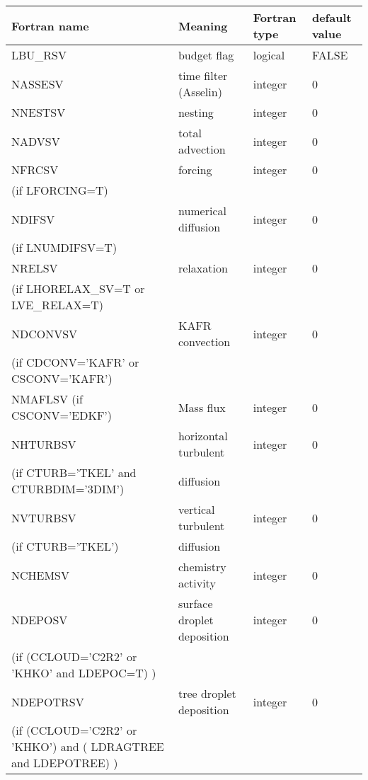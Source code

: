 \begin{center}
\begin{tabular} {|p{8cm}|p{4cm}|>{\centering}p{1.5cm}|p{1.5cm}<{\centering}|} 
\hline
Fortran name & Meaning & Fortran type & default value \\
\hline\hline
LBU\_RSV & budget flag & logical & FALSE\index{LBU\_RSV!\innam{NAM\_BU\_RSV}}\\\hline
NASSESV  & time filter (Asselin)   & integer  &  0 \index{NASSESV!\innam{NAM\_BU\_RSV}} \\\hline
NNESTSV  & nesting       & integer  &  0 \index{NNESTSV!\innam{NAM\_BU\_RSV}} \\\hline
NADVSV   & total advection   & integer  &  0 \index{NADVSV!\innam{NAM\_BU\_RSV}}\\\hline
NFRCSV   & forcing           & integer  &  0 \index{NFRCSV!\innam{NAM\_BU\_RSV}} \\
(if LFORCING=T) &  &   &   \\\hline
NDIFSV   & numerical diffusion & integer &  0 \index{NDIFSV!\innam{NAM\_BU\_RSV}}\\
(if LNUMDIFSV=T) &  &   &   \\\hline
NRELSV   & relaxation        & integer  &  0 \index{NRELSV!\innam{NAM\_BU\_RSV}}\\
(if LHORELAX\_SV=T or LVE\_RELAX=T) &  &   &   \\\hline
NDCONVSV & KAFR convection   & integer  &  0 \index{NDCONVSV!\innam{NAM\_BU\_RSV}} \\
(if CDCONV='KAFR' or CSCONV='KAFR') &  &   &   \\\hline
NMAFLSV (if CSCONV='EDKF') & Mass flux & integer  &  0 \index{NMAFLSV!\innam{NAM\_BU\_RSV}} \\\hline
NHTURBSV & horizontal turbulent  & integer  &  0 \index{NHTURBSV!\innam{NAM\_BU\_RSV}} \\
(if CTURB='TKEL' and CTURBDIM='3DIM') &diffusion &   &  \\\hline
NVTURBSV & vertical turbulent  & integer  &  0 \index{NVTURBSV!\innam{NAM\_BU\_RSV}}\\
(if CTURB='TKEL') &diffusion &   &  \\\hline
NCHEMSV & chemistry activity & integer  &  0 \index{NCHEMSV!\innam{NAM\_BU\_RSV}} \\
NDEPOSV  & surface droplet deposition   & integer  &  0 \index{NDEPOSV!\innam{NAM\_BU\_RRC}}\\
(if (CCLOUD='C2R2' or 'KHKO' and LDEPOC=T) ) &  &   &   \\\hline
NDEPOTRSV  & tree droplet deposition   & integer  &  0 \index{NDEPOTRSV!\innam{NAM\_BU\_RRC}}\\
(if (CCLOUD='C2R2' or 'KHKO') and ( LDRAGTREE and LDEPOTREE)  ) &  &   &   \\\hline
\end{tabular}
\end{center}
\newpage
